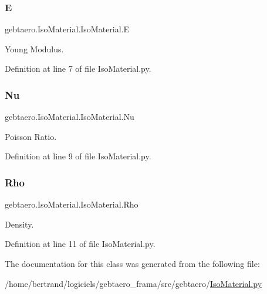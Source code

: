 \subsubsection{\texorpdfstring{E}{E}}
{\footnotesize\ttfamily gebtaero.\+Iso\+Material.\+Iso\+Material.\+E}



Young Modulus. 



Definition at line 7 of file Iso\+Material.\+py.

\mbox{\label{classgebtaero_1_1_iso_material_1_1_iso_material_a1a590e5600152a083c4ee3d0fb12451a}} 
\subsubsection{\texorpdfstring{Nu}{Nu}}
{\footnotesize\ttfamily gebtaero.\+Iso\+Material.\+Iso\+Material.\+Nu}



Poisson Ratio. 



Definition at line 9 of file Iso\+Material.\+py.

\mbox{\label{classgebtaero_1_1_iso_material_1_1_iso_material_ace8e4cdd649efe5f36fd0093afa6b93a}} 
\subsubsection{\texorpdfstring{Rho}{Rho}}
{\footnotesize\ttfamily gebtaero.\+Iso\+Material.\+Iso\+Material.\+Rho}



Density. 



Definition at line 11 of file Iso\+Material.\+py.



The documentation for this class was generated from the following file\+:\begin{DoxyCompactItemize}
\item 
/home/bertrand/logiciels/gebtaero\+\_\+frama/src/gebtaero/\hyperlink{_iso_material_8py}{Iso\+Material.\+py}\end{DoxyCompactItemize}
